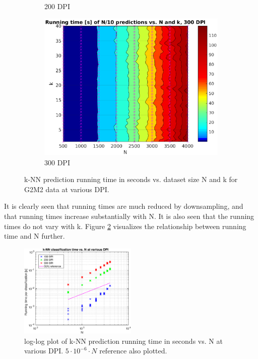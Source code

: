 \begin{figure}
\begin{subfigure}{0.32\textwidth}
		\caption{200 DPI}
	\end{subfigure}
	\begin{subfigure}{0.32\textwidth}
		\includegraphics[width = \textwidth]{img/knn-runningTimeVsKVSN-G2M2-dpi300}
		\caption{300 DPI}
	\end{subfigure}
	\caption{
		k-NN prediction running time in seconds
		vs. dataset size N and k for G2M2 data at various DPI.
		}
	\label{fig:knn-runningtime-vs-n-and-k}
\end{figure}

It is clearly seen that running times are much reduced by downsampling,
and that running times increase substantially with N. It is also seen that
the running times do not vary with k.
Figure \ref{fig:knn-runningtime-vs-n-loglog} visualizes the relationship
between running time and N further.
\begin{figure}
	\centering
	\includegraphics[width = 0.5\textwidth]{img/knn-runningTimeVsNVsDPI-G2M2}
	\caption[k-NN prediction running time in seconds vs. N at various DPI.]{
		log-log plot of k-NN prediction running time in seconds vs. N at various DPI.
		\(5\cdot{}10^{-6}\cdot{}N\) reference also plotted.
	}
	\label{fig:knn-runningtime-vs-n-loglog}
\end{figure}

